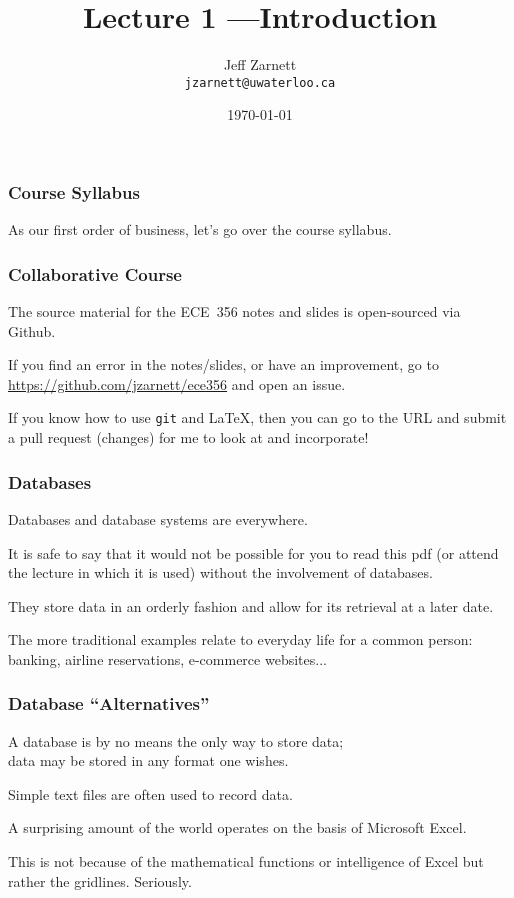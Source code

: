 

\title{Lecture 1 ---Introduction}

\author{Jeff Zarnett \\ \small \texttt{jzarnett@uwaterloo.ca}}
\date{\today}




\begin{frame}
  \titlepage

 \end{frame}

\begin{frame}
\frametitle{Course Syllabus}

As our first order of business, let's go over the course syllabus.

\end{frame}

\begin{frame}
\frametitle{Collaborative Course}

The source material for the ECE~356 notes and slides is open-sourced via Github. 

If you find an error in the notes/slides, or have an improvement, go to \url{https://github.com/jzarnett/ece356} and open an issue. 

If you know how to use \texttt{git} and \LaTeX, then you can go to the URL and submit a pull request (changes) for me to look at and incorporate!


\end{frame}



\begin{frame}
\frametitle{Databases}

Databases and database systems are everywhere. 

It is safe to say that it would not be possible for you to read this pdf (or attend the lecture in which it is used) without the involvement of databases.

They store data in an orderly fashion and allow for its retrieval at a later date.

The more traditional examples relate to everyday life for a common person: banking, airline reservations, e-commerce websites...

\end{frame}



\begin{frame}
\frametitle{Database ``Alternatives''}
A database is by no means the only way to store data; \\
\quad data may be stored in any format one wishes. 

Simple text files are often used to record data. 

A surprising amount of the world operates on the basis of Microsoft Excel. 

This is not because of the mathematical functions or intelligence of Excel but rather the gridlines. Seriously.

\end{frame}



